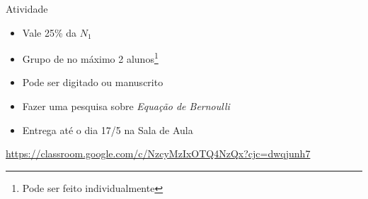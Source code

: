 \documentclass[t,%
brazilian,%
11pt,%
aspectratio=169,%
table%
]{beamer}
\begin{document}





\begin{frame}{Atividade}
    \begin{itemize}
        \item Vale 25\% da \(N_1\)
        \item Grupo de no máximo 2 alunos\footnote{Pode ser feito individualmente}
        \item Pode ser digitado ou manuscrito
        \item Fazer uma pesquisa sobre \textit{Equação de Bernoulli}
        \item Entrega até o dia 17/5 na Sala de Aula
    \end{itemize}

    \centering\url{https://classroom.google.com/c/NzcyMzIxOTQ4NzQx?cjc=dwqjunh7}
\end{frame}




\end{document}
